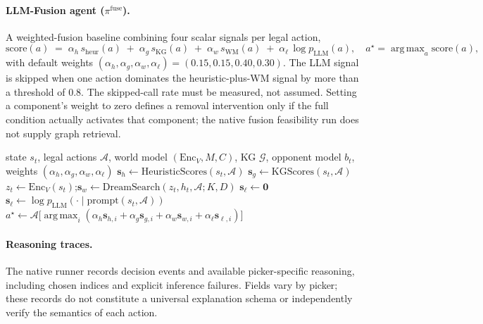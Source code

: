 \documentclass[11pt,a4paper]{article}
\theoremstyle{definition}
\theoremstyle{plain}
\DeclareMathOperator*{\argmax}{arg\,max}
\begin{document}
\paragraph{LLM-Fusion agent ($\pi^{\mathrm{fuse}}$).} A weighted-fusion baseline combining four scalar signals per legal action,
\begin{equation*}
\mathrm{score}(a) \;=\; \alpha_h\,s_{\mathrm{heur}}(a) \;+\; \alpha_g\,s_{\mathrm{KG}}(a) \;+\; \alpha_w\,s_{\mathrm{WM}}(a) \;+\; \alpha_\ell\,\log p_{\mathrm{LLM}}(a),
\quad a^\star = \argmax_a \mathrm{score}(a),
\end{equation*}
with default weights $(\alpha_h, \alpha_g, \alpha_w, \alpha_\ell) = (0.15, 0.15, 0.40, 0.30)$. The LLM signal is skipped when one action dominates the heuristic-plus-WM signal by more than a threshold of $0.8$. The skipped-call rate must be measured, not assumed. Setting a component's weight to zero defines a removal intervention only if the full condition actually activates that component; the native fusion feasibility run does not supply graph retrieval.

\begin{algorithm}[H]
\caption{LLM-Fusion decision (one priority window).}
\label{alg:fusion}
\begin{algorithmic}[1]
\Require state $s_t$, legal actions $\mathcal{A}$, world model $(\mathrm{Enc}_V, M, C)$, KG $\mathcal{G}$, opponent model $b_t$, weights $(\alpha_h, \alpha_g, \alpha_w, \alpha_\ell)$
\State $\mathbf{s}_h \gets \mathrm{HeuristicScores}(s_t, \mathcal{A})$
\State $\mathbf{s}_g \gets \mathrm{KGScores}(s_t, \mathcal{A})$ 
\State $z_t \gets \mathrm{Enc}_V(s_t)$;\quad $\mathbf{s}_w \gets \mathrm{DreamSearch}(z_t, h_t, \mathcal{A}; K, D)$
   \State $\mathbf{s}_\ell \gets \mathbf{0}$ 
\Else
   \State $\mathbf{s}_\ell \gets \log p_{\mathrm{LLM}}(\cdot \mid \mathrm{prompt}(s_t, \mathcal{A}))$
\EndIf
\State \Return $a^\star \gets \mathcal{A}\big[\argmax_i (\alpha_h \mathbf{s}_{h,i} + \alpha_g \mathbf{s}_{g,i} + \alpha_w \mathbf{s}_{w,i} + \alpha_\ell \mathbf{s}_{\ell,i})\big]$
\end{algorithmic}
\end{algorithm}

\paragraph{Reasoning traces.} The native runner records decision events and available picker-specific reasoning, including chosen indices and explicit inference failures. Fields vary by picker; these records do not constitute a universal explanation schema or independently verify the semantics of each action.
\end{document}
